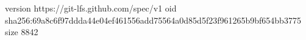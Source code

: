 version https://git-lfs.github.com/spec/v1
oid sha256:69a8c6f97ddda44e04ef461556add75564a0d85d5f23f961265b9bf654bb3775
size 8842
